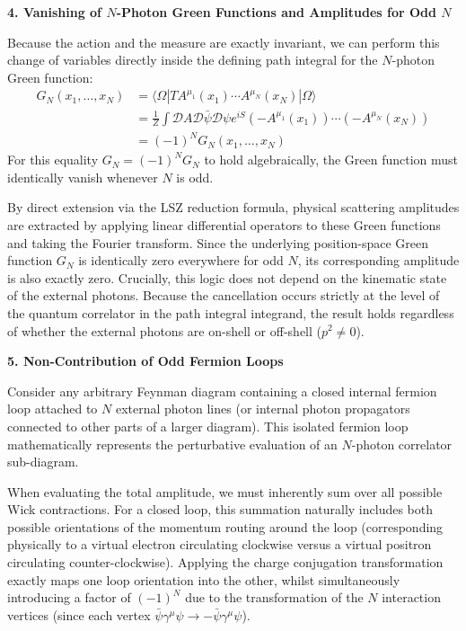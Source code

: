 \textbf{4. Vanishing of $N$-Photon Green Functions and Amplitudes for Odd $N$}

Because the action and the measure are exactly invariant, we can perform this change of variables directly inside the defining path integral for the $N$-photon Green function:
\[
    \begin{aligned}
        G_N(x_1, \dots, x_N) & = \langle \Omega | T A^{\mu_1}(x_1) \cdots A^{\mu_N}(x_N) | \Omega \rangle                                             \\
                             & = \frac{1}{Z} \int \mathcal{D}A \mathcal{D}\bar{\psi}\mathcal{D}\psi e^{iS} (-A^{\mu_1}(x_1)) \cdots (-A^{\mu_N}(x_N)) \\
                             & = (-1)^N G_N(x_1, \dots, x_N)
    \end{aligned}
\]
For this equality $G_N = (-1)^N G_N$ to hold algebraically, the Green function must identically vanish whenever $N$ is odd.

By direct extension via the LSZ reduction formula, physical scattering amplitudes are extracted by applying linear differential operators to these Green functions and taking the Fourier transform. Since the underlying position-space Green function $G_N$ is identically zero everywhere for odd $N$, its corresponding amplitude is also exactly zero.
Crucially, this logic does not depend on the kinematic state of the external photons. Because the cancellation occurs strictly at the level of the quantum correlator in the path integral integrand, the result holds regardless of whether the external photons are on-shell or off-shell ($p^2 \neq 0$).

\textbf{5. Non-Contribution of Odd Fermion Loops}

Consider any arbitrary Feynman diagram containing a closed internal fermion loop attached to $N$ external photon lines (or internal photon propagators connected to other parts of a larger diagram). This isolated fermion loop mathematically represents the perturbative evaluation of an $N$-photon correlator sub-diagram.

When evaluating the total amplitude, we must inherently sum over all possible Wick contractions. For a closed loop, this summation naturally includes both possible orientations of the momentum routing around the loop (corresponding physically to a virtual electron circulating clockwise versus a virtual positron circulating counter-clockwise). Applying the charge conjugation transformation exactly maps one loop orientation into the other, whilst simultaneously introducing a factor of $(-1)^N$ due to the transformation of the $N$ interaction vertices (since each vertex $\bar{\psi}\gamma^\mu\psi \to -\bar{\psi}\gamma^\mu\psi$).

